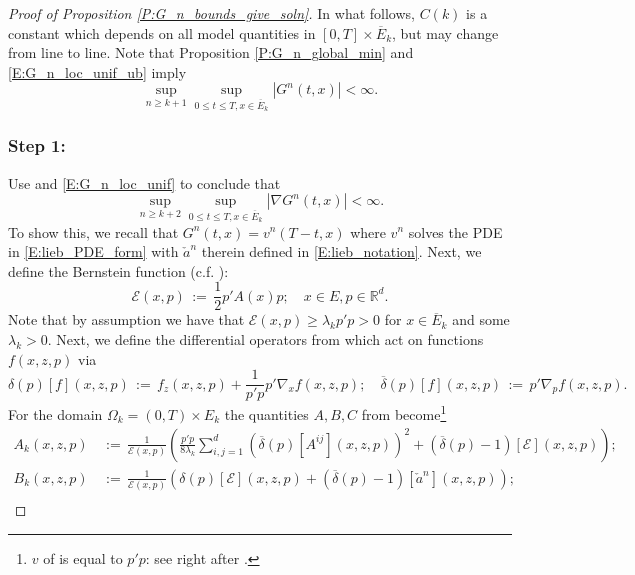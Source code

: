 \documentclass[11pt, letterpaper]{amsart}
\theoremstyle{definition}
\theoremstyle{remark}
\numberwithin{equation}{section}
\newcommand{\reals}{\mathbb R}
\newcommand{\EN}{\mathcal{E}}
\newcommand{\dfn}{\, := \,}
\newcommand{\ol}[1]{\overline{#1}}
\begin{document}
\begin{proof}[Proof of Proposition \ref{P:G_n_bounds_give_soln}]
In what follows, $C(k)$ is a constant which depends on all model quantities in $[0,T]\times\ol{E}_k$, but may change from line to line. Note that Proposition \ref{P:G_n_global_min} and \eqref{E:G_n_loc_unif_ub} imply
\begin{equation}\label{E:G_n_loc_unif}
\sup_{n\geq k+1}\sup_{0\leq t\leq T, x\in \ol{E}_k} |G^n(t,x)| <\infty.
\end{equation}
\subsubsection*{Step 1:} Use \cite[Theorem 11.3(b)]{MR1465184} and \eqref{E:G_n_loc_unif} to conclude that
\begin{equation}\label{E:G_n_gradient_loc_unif}
\sup_{n\geq k+2}\sup_{0\leq t\leq T,x\in \ol{E}_k} |\nabla G^n(t,x)| < \infty.
\end{equation}
To show this, we recall that $G^n(t,x) = v^n(T-t,x)$ where $v^n$ solves the PDE in \eqref{E:lieb_PDE_form} with $\check{a}^n$ therein defined in \eqref{E:lieb_notation}.  Next, we define the Bernstein function (c.f. \cite[Equation (8.3)]{MR1465184}):
\begin{equation}\label{E:bernstein}
\EN(x,p) \dfn \frac{1}{2}p'A(x)p;\quad x\in E, p\in\reals^d.
\end{equation}
Note that by assumption we have that $\EN(x,p) \geq \lambda_k p'p > 0$ for $x\in \ol{E}_k$ and some $\lambda_k>0$.  Next, we define the differential operators from \cite[Chapter 11]{MR1465184} which act on functions $f(x,z,p)$ via
\begin{equation}\label{E:bernstein_delta}
\delta(p)[f](x,z,p) \dfn f_z(x,z,p) + \frac{1}{p'p} p'\nabla_x f(x,z,p);\quad \ol{\delta}(p)[f](x,z,p) \dfn p'\nabla_p f(x,z,p).
\end{equation}
For the domain $\Omega_k = (0,T)\times E_k$ the quantities $A,B,C$ from \cite[Equation (11.7)]{MR1465184} become\footnote{$v$ of \cite[Equation (11.7)]{MR1465184} is equal to $p'p$: see right after \cite[Equation (11.2)]{MR1465184}.}
\begin{equation}\label{E:lieb_A_B_C}
\begin{split}
A_k(x,z,p) &\dfn \frac{1}{\EN(x,p)}\left(\frac{p'p}{8\lambda_k}\sum_{i,j=1}^d \left(\ol{\delta}(p)[A^{ij}](x,z,p)\right)^2 + \left(\ol{\delta}(p)-1\right)[\EN](x,z,p)\right);\\
B_k(x,z,p) &\dfn \frac{1}{\EN(x,p)}\left(\delta(p)[\EN](x,z,p) + \left(\ol{\delta}(p)-1\right)[\check{a}^n](x,z,p)\right);\\

\end{split}
\end{equation}
\end{proof}
\end{document}
